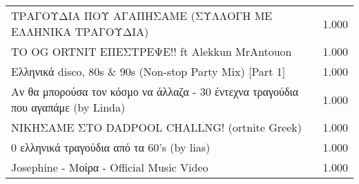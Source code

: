 \begin{table}
\begin{tabular}{|p{10cm}|p{1cm}|}
ΤΡΑΓΟΥΔΙΑ ΠΟΥ ΑΓΑΠΗΣΑΜΕ (ΣΥΛΛΟΓΗ ΜΕ ΕΛΛΗΝΙΚΑ ΤΡΑΓΟΥΔΙΑ) & 1.000 \\
ΤΟ OG ORTNIT ΕΠΕΣΤΡΕΨΕ!! ft Alekkun MrAntouon & 1.000 \\
Ελληνικά disco, 80s \& 90s (Non-stop Party Mix) [Part 1] & 1.000 \\
Αν θα μπορούσα τον κόσμο να άλλαζα - 30 έντεχνα τραγούδια που αγαπάμε (by Linda) & 1.000 \\
ΝΙΚΗΣΑΜΕ ΣΤΟ DADPOOL CHALLNG! (ortnite Greek) & 1.000 \\
0 ελληνικά τραγούδια από τα 60's (by lias) & 1.000 \\
Josephine - Μοίρα - Official Music Video & 1.000 \\
\bottomrule
\end{tabular}
\end{table}
